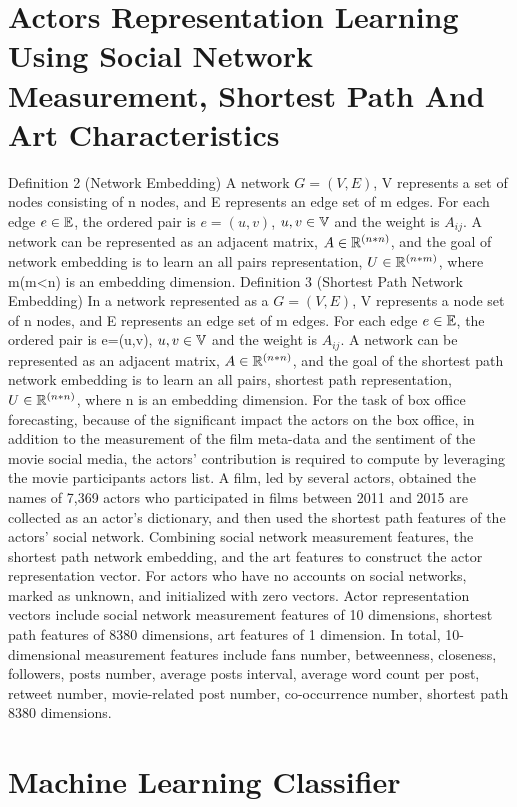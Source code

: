 \documentclass[review]{cvpr}
\begin{document}
\section{Actors Representation Learning Using Social Network Measurement, Shortest Path And Art Characteristics}

Definition 2 (Network Embedding)  A network $G=(V,E)$, V represents a set of nodes consisting of n nodes, and E represents an edge set of m edges. For each edge $e\in \Bbb E$, the ordered pair is $e=(u,v)$, $u,v \in \Bbb V$ and the weight is $A_{ij}$.
A network can be represented as an adjacent matrix, $A\in \Bbb R^{(n*n)}$, and the goal of network embedding is to learn an all pairs representation, $U\in \Bbb R^{(n*m)}$, where m(m<n) is an embedding dimension.
Definition 3 (Shortest Path Network Embedding)  In a network represented as a $G=(V,E)$, V represents a node set of n nodes, and E represents an edge set of m edges.
For each edge $e\in \Bbb E$, the ordered pair is e=(u,v), $u,v \in \Bbb V$ and the weight is $A_{ij}$.
A network can be represented as an adjacent matrix, $A\in \Bbb R^{(n*n)}$, and the goal of the shortest path network embedding is to learn an all pairs, shortest path representation, $U\in \Bbb R^{(n*n)}$, where n is an embedding dimension.
For the task of box office forecasting, because of the significant impact the actors on the box office, in addition to the measurement of the film meta-data and the sentiment of the movie social media, the actors' contribution is required to compute by leveraging the movie participants actors list.
A film, led by several actors, obtained the names of 7,369 actors who participated in films between 2011 and 2015 are collected as an actor's dictionary, and then used the shortest path features of the actors' social network.
Combining social network measurement features, the shortest path network embedding, and the art features to construct the actor representation vector.
For actors who have no accounts on social networks, marked as unknown, and initialized with zero vectors.
Actor representation vectors include social network measurement features of 10 dimensions, shortest path features of 8380 dimensions, art features of 1 dimension.
In total, 10-dimensional measurement features include fans number, betweenness, closeness, followers, posts number, average posts interval, average word count per post, retweet number, movie-related post number, co-occurrence number, shortest path 8380 dimensions.

\section{Machine Learning Classifier}
\end{document}

